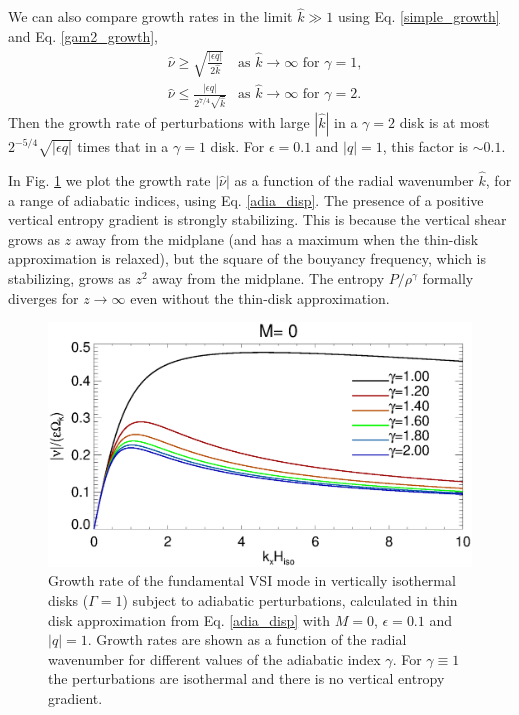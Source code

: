 We can also compare growth rates in the limit $\hat{k}\gg1$ using
Eq. \ref{simple_growth} and Eq. \ref{gam2_growth},
\begin{align}
  &\hat{\nu} \geq \sqrt{\frac{|\epsilon q|}{2\hat{k}}}
  &  \text{as }  \hat{k}\to\infty  \text{ for }  \gamma=1, \\
  &\hat{\nu} \leq \frac{|\epsilon q|}{2^{7/4}\sqrt{\hat{k}}}
  &\text{as }  \hat{k}\to\infty  \text{ for }  \gamma=2.
\end{align}
Then the growth rate of perturbations with large $|\hat{k}|$ in a
$\gamma=2$ disk is at most $2^{-5/4}\sqrt{|\epsilon q|}$ times that in a
$\gamma=1$ disk. For $\epsilon = 0.1$ and $|q|=1$, this factor is
$\sim 0.1$.  

In Fig. \ref{adia_growth} we plot the growth rate $|\hat{\nu}|$ as a
function of the radial wavenumber $\hat{k}$, for a range of adiabatic
indices, using Eq. \ref{adia_disp}. The presence of a positive
vertical entropy gradient is strongly stabilizing. This is because the
vertical shear grows as $z$ away from the midplane (and has a maximum
when the thin-disk approximation is relaxed), but the
square of the bouyancy frequency, which is stabilizing, grows as $z^2$
away from the midplane. The entropy $P/\rho^\gamma$ formally diverges
for $z\to\infty$ even without the thin-disk approximation.        

\begin{figure}
  \includegraphics[width=\linewidth]{figures/rate_theory_gmma}
  \caption{Growth rate of the fundamental VSI mode in vertically
    isothermal disks ($\Gamma=1$) subject to adiabatic perturbations,
    calculated in thin disk approximation from Eq. \ref{adia_disp}
    with $M=0$, $\epsilon=0.1$ and  
    $|q|=1$. Growth rates are shown as a function of the radial
    wavenumber for different values of the adiabatic index
    $\gamma$. For $\gamma\equiv 1$ the perturbations are isothermal
    and there is no vertical entropy gradient.\label{adia_growth}}  
\end{figure}   